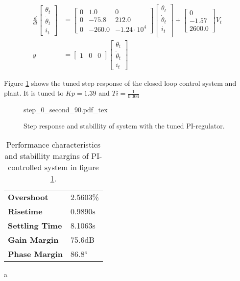 \documentclass[../../../Main]{subfiles}
\begin{document}
\begin{equation}
      \label{eq:90_linearized}
      \begin{split}
      \frac{d}{dt}
    \begin{bmatrix}
        \theta_t \\
        \dot \theta_t \\
        i_t
    \end{bmatrix}
    &=
    \begin{bmatrix}0 & 1.0 & 0\\ 0  & -75.8 & 212.0\\ 0 & -260.0 & -1.24 \cdot 10^4 \end{bmatrix}
    \begin{bmatrix}
        \theta_t \\
        \dot \theta_t \\
        i_t \\
    \end{bmatrix}
    +
    \begin{bmatrix}
     0\\ -1.57\\ 2600.0
    \end{bmatrix}
    V_t \\
		y &=
    \begin{bmatrix}
        1 & 0 & 0
    \end{bmatrix}
    \begin{bmatrix}
        \theta_t \\
        \dot \theta_t\\
        i_t
    \end{bmatrix}
    \end{split}
\end{equation}

Figure \ref{fig:step_0_second_90} shows the tuned step response of the closed loop control system and plant.
It is tuned to $Kp = 1.39$ and $Ti = \frac{1}{0.006}$
\begin{figure}[H]
\centering
\def\svgwidth{\textwidth}
{step_0_second_90.pdf_tex}
\caption{Step response and stabillity  of system with the tuned PI-regulator.}
\label{fig:step_0_second_90}
\end{figure}


\begin{table}[h]
	 \centering
	 \begin{tabular}{ll}
		 \textbf{Overshoot} & 2.5603\%\\
		 \textbf{Risetime}  & 0.9890s\\
		 \textbf{Settling Time} & 8.1063s\\
		 \textbf{Gain Margin} & 75.6dB\\
		 \textbf{Phase Margin} & 86.8$^o$
	 \end{tabular}
	 \caption{Performance characteristics and stabillity margins of PI-controlled system in figure \ref{fig:step_0_second_90}.}
	 \label{tab:performance_0_3}a
\end{table}
\end{document}
